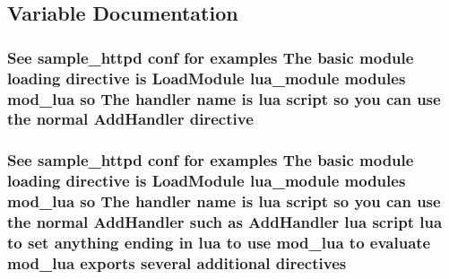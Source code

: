 \subsection{Variable Documentation}
\subsubsection[{\texorpdfstring{directive}{directive}}]{\setlength{\rightskip}{0pt plus 5cm}See sample\+\_\+httpd {\bf conf} for examples The basic {\bf module} loading directive {\bf is} Load\+Module {\bf lua\+\_\+module} modules mod\+\_\+lua {\bf so} The {\bf handler} {\bf name} {\bf is} lua {\bf script} {\bf so} you {\bf can} use the normal Add\+Handler directive}\hypertarget{basic-configuration_8txt_afff511b23780162b3e88a118ec5cb4c9}{}\label{basic-configuration_8txt_afff511b23780162b3e88a118ec5cb4c9}
\subsubsection[{\texorpdfstring{directives}{directives}}]{\setlength{\rightskip}{0pt plus 5cm}See sample\+\_\+httpd {\bf conf} for examples The basic {\bf module} loading {\bf directive} {\bf is} Load\+Module {\bf lua\+\_\+module} modules mod\+\_\+lua {\bf so} The {\bf handler} {\bf name} {\bf is} lua {\bf script} {\bf so} you {\bf can} use the normal Add\+Handler such {\bf as} Add\+Handler lua {\bf script} lua {\bf to} {\bf set} anything ending {\bf in} lua {\bf to} use mod\+\_\+lua {\bf to} evaluate mod\+\_\+lua exports several additional directives}\hypertarget{basic-configuration_8txt_a854b9e2ad54ca06514e1d98029e6a4e1}{}\label{basic-configuration_8txt_a854b9e2ad54ca06514e1d98029e6a4e1}
